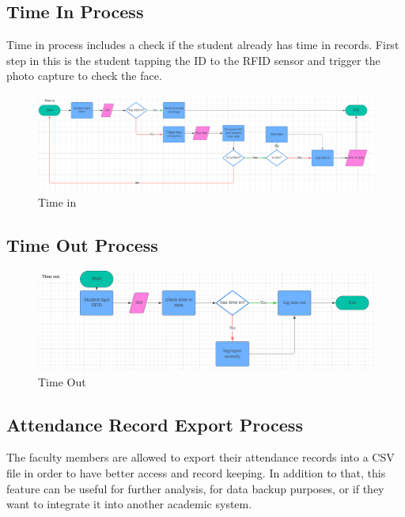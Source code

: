 \subsection{Time In Process}
	Time in process includes a check if the student already has time in records. First step in this is the student tapping the ID to the RFID sensor and trigger the photo capture to check the face.
	\begin{figure}[h] %
		\centering
		\includegraphics[width=1.0\textwidth]{figures/chapter4/timein.png} %
		\caption{Time in}
		\label{fig:timein}
	\end{figure}
	
\clearpage
\subsection{Time Out Process}
\begin{figure}[h] %
	\centering
	\includegraphics[width=1.0\textwidth]{figures/chapter4/timeout.png} %
	\caption{Time Out}
	\label{fig:timeout}
\end{figure}

\subsection{Attendance Record Export Process}
	The faculty members are allowed to export their attendance records into a CSV file in order to have better access and record keeping. In addition to that, this feature can be useful for further analysis, for data backup purposes, or if they want to integrate it into another academic system.
	
